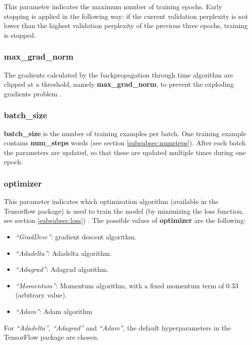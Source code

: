 \documentclass[10pt,a4paper,titlepage]{article}
\begin{document}
This parameter indicates the maximum number of training epochs. Early stopping is applied in the following way: if the current validation perplexity is not lower than the highest validation perplexity of the previous three epochs, training is stopped.

\subsubsection{max\_grad\_norm}

The gradients calculated by the backpropagation through time algorithm are clipped at a threshold, namely \textbf{max\_grad\_norm}, to prevent the exploding gradients problem \cite{bptt,exp}.

\subsubsection{batch\_size}

\textbf{batch\_size} is the number of training examples per batch. One training example contains \textbf{num\_steps} words (see section \ref{subsubsec:numsteps}). After each batch the parameters are updated, so that these are updated multiple times during one epoch.

\subsubsection{optimizer}
\label{subsubsec:opt}

This parameter indicates which optimization algorithm (available in the Tensorflow package) is used to train the model (by minimizing the loss function, see section \ref{subsubsec:loss}) \cite{opt}. The possible values of \textbf{optimizer} are the following:

\begin{itemize}

	\item \textit{``GradDesc''}: gradient descent algorithm.
	\item \textit{``Adadelta''}: Adadelta algorithm.
	\item \textit{``Adagrad''}: Adagrad algorithm.
	\item \textit{``Momentum''}: Momentum algorithm, with a fixed momentum term of 0.33 (arbitrary value).
	\item \textit{``Adam''}: Adam algorithm

\end{itemize}

\noindent
For \textit{``Adadelta''}, \textit{``Adagrad''} and \textit{``Adam''}, the default hyperparameters in the TensorFlow package are chosen. 
\end{document}
